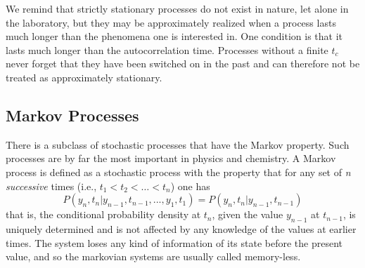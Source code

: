 \documentclass[12pt,a4paper]{report}
\begin{document}
We remind that strictly stationary processes do not exist in nature, let alone in the laboratory, but they may be approximately realized when a process lasts much longer than the phenomena one is interested in. One condition is that it lasts much longer than the autocorrelation time. Processes without a finite $t_{c}$ never forget that they have been switched on in the past and can therefore not be treated as approximately stationary.

\subsection{Markov Processes}
There is a subclass of stochastic processes that have the Markov property. Such processes are by far the most important in physics and chemistry. A Markov process is defined as a stochastic process with the property that for any set of \emph{n successive} times (i.e., $t_{1} < t_{2} < … < t_{n}$) one has
\begin{equation}\label{Markov}
P(y_{n},t_{n}|y_{n-1},t_{n-1},...,y_{1},t_{1}) = P(y_{n},t_{n}|y_{n-1},t_{n-1})
\end{equation}
that is, the conditional probability density at $t_{n}$, given the value $y_{n-1}$ at $t_{n-1}$, is uniquely determined and is not affected by any knowledge of the values at earlier times. The system loses any kind of information of its state before the present value, and so the markovian systems are usually called memory-less.
\end{document}
